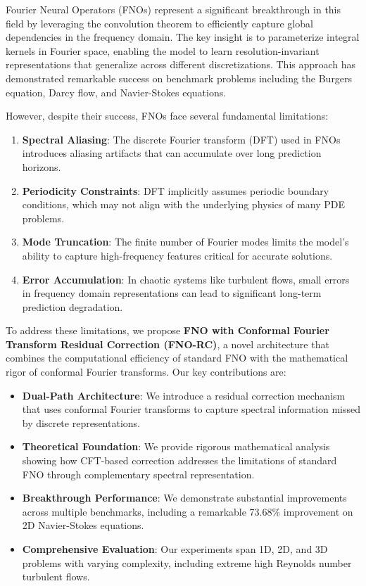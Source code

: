 \documentclass[11pt,twocolumn]{article}
\begin{document}
Fourier Neural Operators (FNOs) \citep{li2020fourier} represent a significant breakthrough in this field by leveraging the convolution theorem to efficiently capture global dependencies in the frequency domain. The key insight is to parameterize integral kernels in Fourier space, enabling the model to learn resolution-invariant representations that generalize across different discretizations. This approach has demonstrated remarkable success on benchmark problems including the Burgers equation, Darcy flow, and Navier-Stokes equations.

However, despite their success, FNOs face several fundamental limitations:

\begin{enumerate}
    \item \textbf{Spectral Aliasing}: The discrete Fourier transform (DFT) used in FNOs introduces aliasing artifacts that can accumulate over long prediction horizons.
    \item \textbf{Periodicity Constraints}: DFT implicitly assumes periodic boundary conditions, which may not align with the underlying physics of many PDE problems.
    \item \textbf{Mode Truncation}: The finite number of Fourier modes limits the model's ability to capture high-frequency features critical for accurate solutions.
    \item \textbf{Error Accumulation}: In chaotic systems like turbulent flows, small errors in frequency domain representations can lead to significant long-term prediction degradation.
\end{enumerate}

To address these limitations, we propose \textbf{FNO with Conformal Fourier Transform Residual Correction (FNO-RC)}, a novel architecture that combines the computational efficiency of standard FNO with the mathematical rigor of conformal Fourier transforms. Our key contributions are:

\begin{itemize}
    \item \textbf{Dual-Path Architecture}: We introduce a residual correction mechanism that uses conformal Fourier transforms to capture spectral information missed by discrete representations.
    \item \textbf{Theoretical Foundation}: We provide rigorous mathematical analysis showing how CFT-based correction addresses the limitations of standard FNO through complementary spectral representation.
    \item \textbf{Breakthrough Performance}: We demonstrate substantial improvements across multiple benchmarks, including a remarkable 73.68\% improvement on 2D Navier-Stokes equations.
    \item \textbf{Comprehensive Evaluation}: Our experiments span 1D, 2D, and 3D problems with varying complexity, including extreme high Reynolds number turbulent flows.
\end{itemize}
\end{document}
